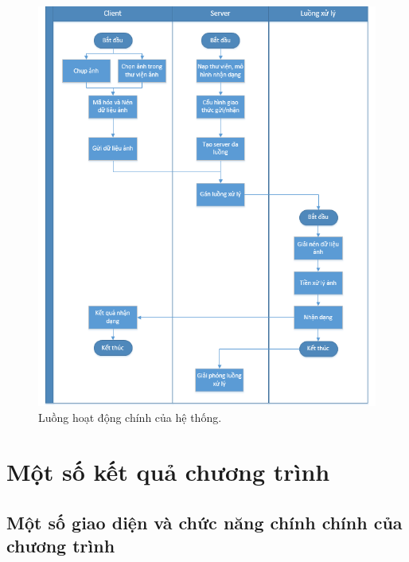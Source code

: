 \begin{figure}[H]
	\centering
	\includegraphics[width=1\linewidth]{images/app_sequence}
	\caption{Luồng hoạt động chính của hệ thống.}
	\label{fig:app_sequence}
\end{figure}

\section{Một số kết quả chương trình}
\subsection{Một số giao diện và chức năng chính chính của chương trình}
